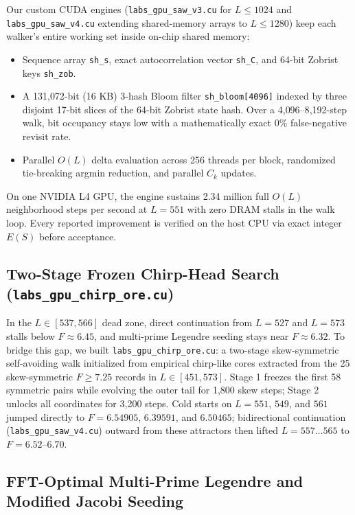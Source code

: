 \documentclass[10.5pt,letterpaper]{article}
\begin{document}
Our custom CUDA engines (\texttt{labs\_gpu\_saw\_v3.cu} for $L \le 1024$ and \texttt{labs\_gpu\_saw\_v4.cu} extending shared-memory arrays to $L \le 1280$) keep each walker's entire working set inside on-chip shared memory:
\begin{itemize}
\item Sequence array \texttt{sh\_s}, exact autocorrelation vector \texttt{sh\_C}, and 64-bit Zobrist keys \texttt{sh\_zob}.
\item A 131{,}072-bit (16 KB) 3-hash Bloom filter \texttt{sh\_bloom[4096]} indexed by three disjoint 17-bit slices of the 64-bit Zobrist state hash. Over a 4{,}096--8{,}192-step walk, bit occupancy stays low with a mathematically exact 0\% false-negative revisit rate.
\item Parallel $O(L)$ delta evaluation across 256 threads per block, randomized tie-breaking argmin reduction, and parallel $C_k$ updates.
\end{itemize}
On one NVIDIA L4 GPU, the engine sustains 2.34 million full $O(L)$ neighborhood steps per second at $L = 551$ with zero DRAM stalls in the walk loop. Every reported improvement is verified on the host CPU via exact integer $E(S)$ before acceptance.

\subsection{Two-Stage Frozen Chirp-Head Search (\texttt{labs\_gpu\_chirp\_ore.cu})}

In the $L \in [537, 566]$ dead zone, direct continuation from $L = 527$ and $L = 573$ stalls below $F \approx 6.45$, and multi-prime Legendre seeding stays near $F \approx 6.32$. To bridge this gap, we built \texttt{labs\_gpu\_chirp\_ore.cu}: a two-stage skew-symmetric self-avoiding walk initialized from empirical chirp-like cores extracted from the 25 skew-symmetric $F \ge 7.25$ records in $L \in [451, 573]$. Stage 1 freezes the first 58 symmetric pairs while evolving the outer tail for 1{,}800 skew steps; Stage 2 unlocks all coordinates for 3{,}200 steps. Cold starts on $L = 551$, $549$, and $561$ jumped directly to $F = 6.54905$, $6.39591$, and $6.50465$; bidirectional continuation (\texttt{labs\_gpu\_saw\_v4.cu}) outward from these attractors then lifted $L = 557\dots 565$ to $F = 6.52$--$6.70$.

\subsection{FFT-Optimal Multi-Prime Legendre and Modified Jacobi Seeding}
\end{document}
